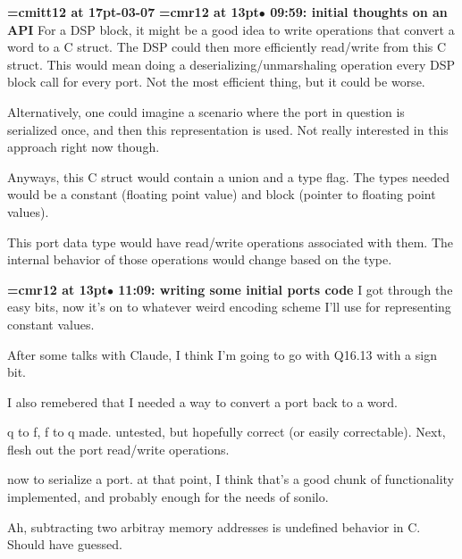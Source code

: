 {\medskip\noindent\bf\font\titlefont=cmitt12 at 17pt-03-07}\medskip
{\smallskip\noindent\bf\font\titlefont=cmr12 at 13pt\titlefont $\bullet$ 09:59: initial thoughts on an API}\smallskip
For a DSP block, it might be a good idea to write operations that convert a word to a C struct. The DSP could then more efficiently read/write from this C struct. This would mean doing a deserializing/unmarshaling operation every DSP block call for every port. Not the most efficient thing, but it could be worse.
\par

Alternatively, one could imagine a scenario where the port in question is serialized once, and then this representation is used. Not really interested in this approach right now though.
\par

Anyways, this C struct would contain a union and a type flag. The types needed would be a constant (floating point value) and block (pointer to floating point values).
\par

This port data type would have read/write operations associated with them. The internal behavior of those operations would change based on the type.
\par

{\smallskip\noindent\bf\font\titlefont=cmr12 at 13pt\titlefont $\bullet$ 11:09: writing some initial ports code}\smallskip
I got through the easy bits, now it's on to whatever weird encoding scheme I'll use for representing constant values.
\par

After some talks with Claude, I think I'm going to go with Q16.13 with a sign bit.
\par

I also remebered that I needed a way to convert a port back to a word.
\par

q to f, f to q made. untested, but hopefully correct (or easily correctable). Next, flesh out the port read/write operations.
\par

now to serialize a port. at that point, I think that's a good chunk of functionality implemented, and probably enough for the needs of sonilo.
\par

Ah, subtracting two arbitray memory addresses is undefined behavior in C. Should have guessed.
\par

